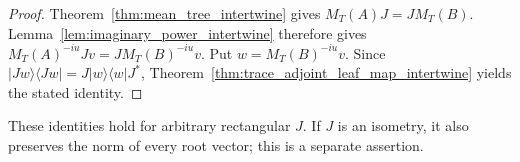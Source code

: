 \begin{proof}
  \leanok
  Theorem~\ref{thm:mean_tree_intertwine} gives $M_T(A)J=JM_T(B)$.
  Lemma~\ref{lem:imaginary_power_intertwine} therefore gives
  $M_T(A)^{-iu}Jv=JM_T(B)^{-iu}v$.
  Put $w=M_T(B)^{-iu}v$. Since $|Jw\rangle\langle Jw|
  =J|w\rangle\langle w|J^*$, Theorem~\ref{thm:trace_adjoint_leaf_map_intertwine}
  yields the stated identity.
\end{proof}

These identities hold for arbitrary rectangular $J$.
If $J$ is an isometry, it also preserves the norm of every root vector;
this is a separate assertion.
